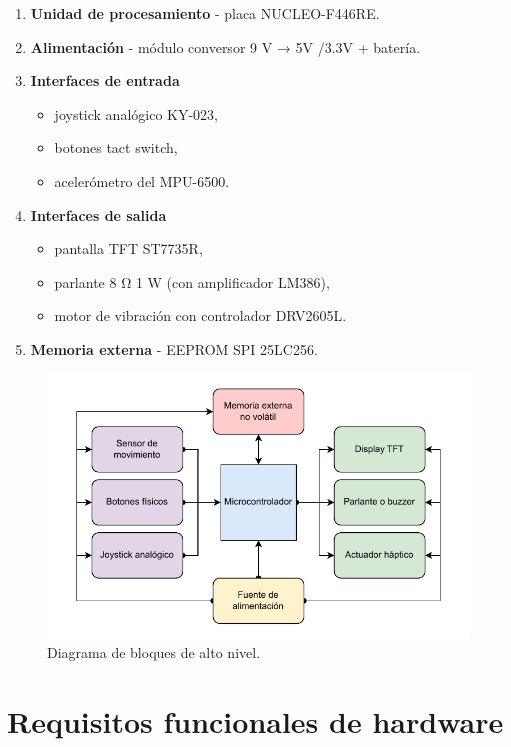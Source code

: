 \documentclass[11pt,a4paper]{article}
\begin{document}
\begin{enumerate}
  \item \textbf{Unidad de procesamiento} - placa NUCLEO-F446RE.
  \item \textbf{Alimentación} - módulo conversor 9 {\si\volt} → 5{\si\volt} /{3.3}{\si\volt} + batería.
  \item \textbf{Interfaces de entrada}
  \begin{itemize}
    \item joystick analógico KY-023, 
    \item botones tact switch, 
    \item acelerómetro del MPU-6500.
  \end{itemize}
  \item \textbf{Interfaces de salida} 
  \begin{itemize}
    \item pantalla TFT ST7735R, 
    \item parlante 8 Ω 1 W (con amplificador LM386), 
    \item motor de vibración con controlador DRV2605L.
  \end{itemize}
  \item \textbf{Memoria externa} - EEPROM SPI 25LC256.
\end{enumerate}

\begin{figure}[h]
  \centering
  \includegraphics[width=.9\linewidth]{../Figuras/diagrama_bloques_proyecto.pdf}
  \caption{Diagrama de bloques de alto nivel.}
\end{figure}

\section{Requisitos funcionales de hardware}
\end{document}
